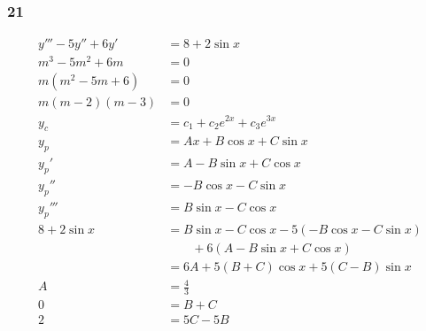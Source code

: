 \documentclass{article}
\begin{document}
\subsubsection{21}

\begin{align*}
  y''' - 5 y'' + 6 y' & = 8 + 2 \sin x                                                                              \\
  m^3 - 5 m^2 + 6 m   & = 0                                                                                         \\
  m (m^2 - 5 m + 6)   & = 0                                                                                         \\
  m (m - 2) (m - 3)   & = 0                                                                                         \\
  y_c                 & = c_1 + c_2 e^{2 x} + c_3 e^{3 x}                                                           \\
  y_p                 & = A x + B \cos x + C \sin x                                                                 \\
  y_p'                & = A - B \sin x + C \cos x                                                                   \\
  y_p''               & = -B \cos x - C \sin x                                                                      \\
  y_p'''              & = B \sin x - C \cos x                                                                       \\
  8 + 2 \sin x        & = B \sin x - C \cos x - 5 (-B \cos x - C \sin x)                                            \\
                      & \qquad + 6 (A - B \sin x + C \cos x)                                                        \\
                      & = 6 A + 5 (B + C) \cos x + 5 (C - B) \sin x                                                 \\
  A                   & = \frac{4}{3}                                                                               \\
  0                   & = B + C                                                                                     \\
  2                   & = 5 C - 5 B                                                                                 \\

\end{align*}
\end{document}
